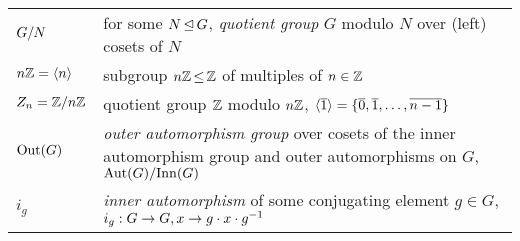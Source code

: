 \begin{fullwidth}
\begin{longtable}{p{2cm}l}
    $G/N$ & for some $N \operatorname*{\trianglelefteq} G$, \emph{quotient group} $G$ modulo $N$ over (left) cosets of $N$ \\
    $n\mathbb{Z} = \langle n \rangle$ & subgroup $n\mathbb{Z} \operatorname*{\leq} \mathbb{Z}$ of multiples of $n \in \mathbb{Z}$ \\
    $Z_n = \mathbb{Z}/n\mathbb{Z}$ & quotient group $\mathbb{Z}$ modulo $n\mathbb{Z}$, $\langle \overline{1} \rangle = \{\overline{0}, \overline{1}, \dots, \overline{n-1}\}$ \\
    $\mathrm{Out}(G)$ & \makecell[tl]{\emph{outer automorphism group} over cosets of the inner automorphism group and \\ outer automorphisms on $G$, $\mathrm{Aut}(G)/\mathrm{Inn}(G)$} \\
    \addlinespace
    $i_g$ & \emph{inner automorphism} of some conjugating element $g \in G$, $i_g : G \to G, x \to g \cdot x \cdot g^{-1}$ \\
\end{longtable}
\end{fullwidth}
